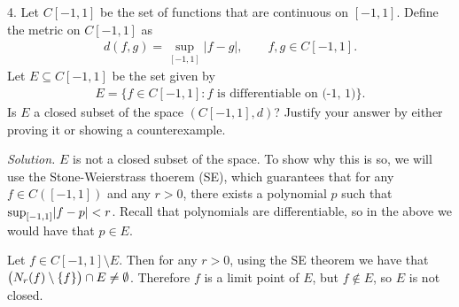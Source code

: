 \documentclass{article}
\begin{document}
\newpage

4. Let $C[-1, 1]$ be the set of functions that are continuous on $[-1,
   1]$. Define the metric on $C[-1, 1]$ as
%
\begin{align*}
    d(f, g) =  \sup_{[-1, 1]} |f - g|,
    \qquad
    f, g \in C[-1, 1].
\end{align*}
%
Let $E \subseteq C[-1, 1]$ be the set given by
%
\begin{align*}
   E = \{f \in C[-1, 1] : \text{$f$ is differentiable on (-1, 1)}\}.
\end{align*}
%
Is $E$ a closed subset of the space $(C[-1, 1], d)$? Justify your answer
by either proving it or showing a counterexample.

\textit{Solution.}
$E$ is not a closed subset of the space. To show why this is so, we will
use the Stone-Weierstrass thoerem (SE), which guarantees that for any $f
\in C([-1, 1])$ and any $r > 0$, there exists a polynomial $p$ such that
$\sup_{[-1, 1]} \envert{f - p} < r$. Recall that polynomials are
differentiable, so in the above we would have that $p \in E$.

Let $f \in C[-1, 1] \setminus E$. Then for any $r > 0$, using the SE
theorem we have that $\del{N_r(f) \setminus \cbr{f}} \cap E \neq
\emptyset$. Therefore $f$ is a limit point of $E$, but $f \not\in E$, so
$E$ is not closed.
\end{document}
